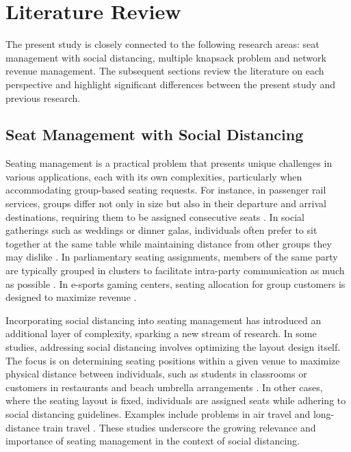 \section{Literature Review}\label{literature}
The present study is closely connected to the following research areas: seat management with social distancing, multiple knapsack problem and network revenue management. The subsequent sections review the literature on each perspective and highlight significant differences between the present study and previous research.


\subsection{Seat Management with Social Distancing}
Seating management is a practical problem that presents unique challenges in various applications, each with its own complexities, particularly when accommodating group-based seating requests. For instance, in passenger rail services, groups differ not only in size but also in their departure and arrival destinations, requiring them to be assigned consecutive seats \cite{clausen2010off, deplano2019offline}. In social gatherings such as weddings or dinner galas, individuals often prefer to sit together at the same table while maintaining distance from other groups they may dislike \cite{lewis2016creating}. In parliamentary seating assignments, members of the same party are typically grouped in clusters to facilitate intra-party communication as much as possible \cite{vangerven2022parliament}. In e-sports gaming centers, seating allocation for group customers is designed to maximize revenue \cite{kwag2022optimal}.

Incorporating social distancing into seating management has introduced an additional layer of complexity, sparking a new stream of research. In some studies, addressing social distancing involves optimizing the layout design itself. The focus is on determining seating positions within a given venue to maximize physical distance between individuals, such as students in classrooms \cite{bortolete2022support} or customers in restaurants and beach umbrella arrangements \cite{fischetti2023safe}. In other cases, where the seating layout is fixed, individuals are assigned seats while adhering to social distancing guidelines. Examples include problems in air travel \cite{ghorbani2020model} and long-distance train travel \cite{haque2022optimization}. These studies underscore the growing relevance and importance of seating management in the context of social distancing.


